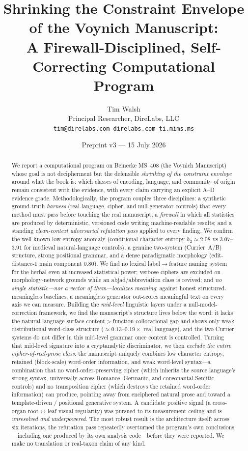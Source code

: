 \documentclass[11pt]{article}
\title{\textbf{Shrinking the Constraint Envelope of the Voynich Manuscript:\\
A Firewall-Disciplined, Self-Correcting Computational Program}}
\author{Tim Walsh \\ \small Principal Researcher, DireLabs, LLC \\
\small \texttt{tim@direlabs.com \quad direlabs.com \quad ti.mims.ms}}
\date{Preprint v3 --- 15 July 2026}
\begin{document}
\maketitle

\begin{abstract}
\noindent We report a computational program on Beinecke MS~408 (the Voynich
Manuscript) whose goal is not decipherment but the defensible \emph{shrinking of the
constraint envelope} around what the book is: which classes of encoding, language,
and community of origin remain consistent with the evidence, with every claim carrying
an explicit A--D evidence grade. Methodologically, the program couples three
disciplines: a synthetic ground-truth \emph{harness} (real-language, cipher, and
null-generator controls) that every method must pass before touching the real
manuscript; a \emph{firewall} in which all statistics are produced by deterministic,
versioned code writing machine-readable results; and a standing \emph{clean-context
adversarial refutation pass} applied to every finding. We confirm the well-known
low-entropy anomaly (conditional character entropy $h_2\approx 2.08$ vs
$3.07$--$3.91$ for medieval natural-language controls), a genuine two-system
(Currier~A/B) structure, strong positional grammar, and a dense paradigmatic
morphology (edit-distance-1 main component $0.80$). We find no lexical
label$\rightarrow$feature naming system for the herbal even at increased statistical
power; verbose ciphers are excluded on morphology-network grounds while an
abjad/abbreviation class is revived; and \emph{no single statistic---nor a vector of
them---localizes meaning}: against honest structured-meaningless baselines, a
meaningless generator out-scores meaningful text on every axis we can measure. Building
the \emph{mid-level} linguistic layers under a null-model-correction framework, we find
the manuscript's structure lives below the word: it lacks the natural-language surface
content$>$function collocational gap and shows only weak distributional word-class
structure ($\approx\!0.13$--$0.19\times$ real language), and the two Currier systems do
not differ in this mid-level grammar once content is controlled. Turning that mid-level
signature into a cryptanalytic discriminator, we then \emph{exclude the entire
cipher-of-real-prose class}: the manuscript uniquely combines low character entropy,
retained (block-scale) word-order information, and weak word-level syntax---a
combination that no word-order-preserving cipher (which inherits the source language's
strong syntax, universally across Romance, Germanic, and consonantal-Semitic controls)
and no transposition cipher (which destroys the retained word-order information) can
produce, pointing away from enciphered natural prose and toward a template-driven /
positional generative system. A candidate positive signal (a cross-organ
root$\leftrightarrow$leaf visual regularity) was pursued to its measurement ceiling and
is \emph{unresolved and underpowered}. The most robust result is the architecture
itself: across six iterations, the refutation pass repeatedly overturned the program's
own conclusions---including one produced by its own analysis code---before they were
reported. We make no translation or real-taxon claim of any kind.
\end{abstract}
\end{document}
